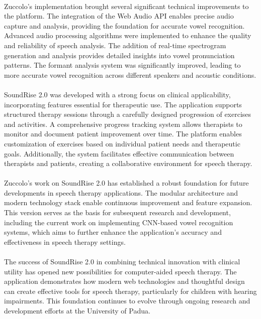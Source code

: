 \paragraph{}
Zuccolo's implementation brought several significant technical improvements to the platform. The integration of the Web Audio API enables precise audio capture and analysis, providing the foundation for accurate vowel recognition. Advanced audio processing algorithms were implemented to enhance the quality and reliability of speech analysis. The addition of real-time spectrogram generation and analysis provides detailed insights into vowel pronunciation patterns. The formant analysis system was significantly improved, leading to more accurate vowel recognition across different speakers and acoustic conditions.


\paragraph{}
SoundRise 2.0 was developed with a strong focus on clinical applicability, incorporating features essential for therapeutic use. The application supports structured therapy sessions through a carefully designed progression of exercises and activities. A comprehensive progress tracking system allows therapists to monitor and document patient improvement over time. The platform enables customization of exercises based on individual patient needs and therapeutic goals. Additionally, the system facilitates effective communication between therapists and patients, creating a collaborative environment for speech therapy.


\paragraph{}
Zuccolo's work on SoundRise 2.0 has established a robust foundation for future developments in speech therapy applications. The modular architecture and modern technology stack enable continuous improvement and feature expansion. This version serves as the basis for subsequent research and development, including the current work on implementing CNN-based vowel recognition systems, which aims to further enhance the application's accuracy and effectiveness in speech therapy settings.

\paragraph{}
The success of SoundRise 2.0 in combining technical innovation with clinical utility has opened new possibilities for computer-aided speech therapy. The application demonstrates how modern web technologies and thoughtful design can create effective tools for speech therapy, particularly for children with hearing impairments. This foundation continues to evolve through ongoing research and development efforts at the University of Padua.

